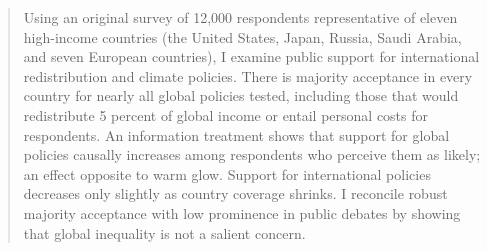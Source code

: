 \documentclass[12pt,english]{article}
\begin{document}
\begin{abstract}

Using an original survey of 12,000 respondents representative of eleven high-income countries (the United States, Japan, Russia, Saudi Arabia, and seven European countries), I examine public support for international redistribution and climate policies. There is majority acceptance in every country for nearly all global policies tested, including those that would redistribute 5 percent of global income or entail personal costs for respondents. An information treatment shows that support for global policies causally increases among respondents who perceive them as likely; an effect opposite to warm glow. Support for international policies decreases only slightly as country coverage shrinks. I reconcile robust majority acceptance with low prominence in public debates by showing that global inequality is not a salient concern.





\end{abstract}
\end{document}

